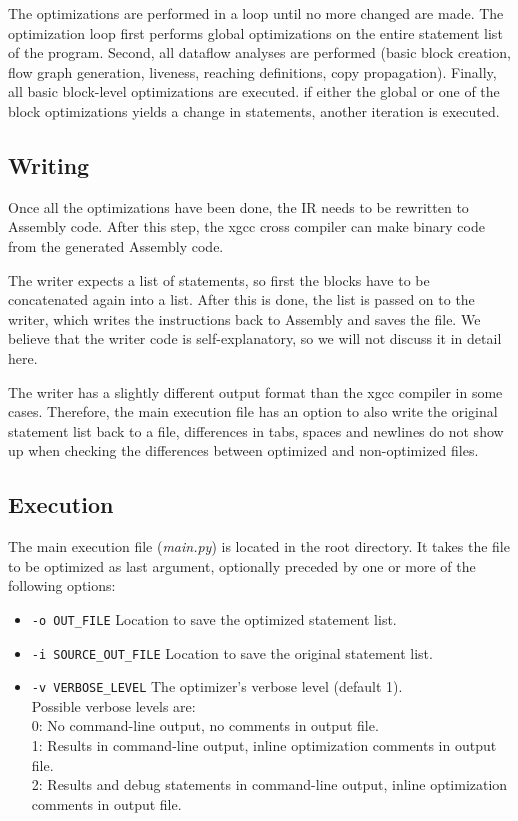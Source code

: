 \documentclass[10pt,a4paper]{article}
\begin{document}
The optimizations are performed in a loop until no more changed are made. The
optimization loop first performs global optimizations on the entire statement
list of the program. Second, all dataflow analyses are performed (basic block
creation, flow graph generation, liveness, reaching definitions, copy
propagation). Finally, all basic block-level optimizations are executed. if
either the global or one of the block optimizations yields a change in
statements, another iteration is executed.

\subsection{Writing}

Once all the optimizations have been done, the IR needs to be rewritten to
Assembly code. After this step, the xgcc cross compiler can make binary code
from the generated Assembly code.

The writer expects a list of statements, so first the blocks have to be
concatenated again into a list. After this is done, the list is passed on to
the writer, which writes the instructions back to Assembly and saves the file.
We believe that the writer code is self-explanatory, so we will not discuss it
in detail here.

The writer has a slightly different output format than the xgcc compiler in
some cases. Therefore, the main execution file has an option to also write the
original statement list back to a file, differences in tabs, spaces and
newlines do not show up when checking the differences between optimized and
non-optimized files.

\subsection{Execution}

The main execution file (\emph{main.py}) is located in the root directory. It
takes the file to be optimized as last argument, optionally preceded by one or
more of the following options:
\begin{itemize}
    \item \texttt{-o OUT\_FILE}
          Location to save the optimized statement list.
    \item \texttt{-i SOURCE\_OUT\_FILE}
          Location to save the original statement list.
    \item \texttt{-v VERBOSE\_LEVEL}
          The optimizer's verbose level (default 1). \\
          Possible verbose levels are: \\
          0: No command-line output, no comments in output file. \\
          1: Results in command-line output, inline optimization comments in
             output file. \\
          2: Results and debug statements in command-line output, inline
             optimization comments in output file. \\
\end{itemize}
\end{document}
